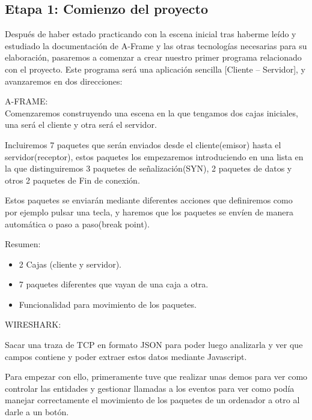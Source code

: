 \documentclass[a4paper, 12pt]{book}
\begin{document}
\newpage
\subsection{Etapa 1: Comienzo del proyecto}

Después de haber estado practicando con la escena inicial tras haberme leído y estudiado la documentación de A-Frame y las otras tecnologías necesarias para su elaboración, pasaremos a comenzar a crear nuestro primer programa relacionado con el proyecto.
Este programa será una aplicación sencilla [Cliente – Servidor], y avanzaremos en dos direcciones:


\begin{flushleft}
A-FRAME:
\\
Comenzaremos construyendo una escena en la que tengamos dos cajas iniciales, una será el cliente y otra será el servidor.

Incluiremos 7 paquetes que serán enviados desde el cliente(emisor) hasta el servidor(receptor), estos paquetes los empezaremos introduciendo en una lista en la que distinguiremos 3 paquetes de señalización(SYN), 2 paquetes de datos y otros 2 paquetes de Fin de conexión.

Estos paquetes se enviarán mediante diferentes acciones que definiremos como por ejemplo pulsar una tecla, y haremos que los paquetes se envíen de manera automática o paso a paso(break point).
\end{flushleft}

Resumen:
\begin{itemize}
    \item 2 Cajas (cliente y servidor).
    \item 7 paquetes diferentes que vayan de una caja a otra.
    \item Funcionalidad para movimiento de los paquetes.
\end{itemize}

\begin{flushleft}
WIRESHARK:

Sacar una traza de TCP en formato JSON para poder luego analizarla y ver que campos contiene y poder extraer estos datos mediante Javascript.
\end{flushleft}


Para empezar con ello, primeramente tuve que realizar unas demos para ver como controlar las entidades y gestionar llamadas a los eventos para ver como podía manejar correctamente el movimiento de los paquetes de un ordenador a otro al darle a un botón.
\end{document}
